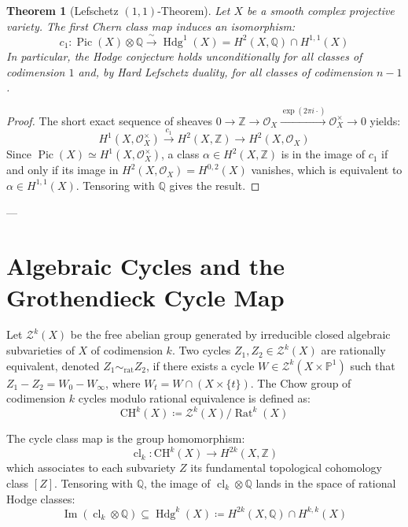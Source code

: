\documentclass[11pt,a4paper]{article}
\newtheorem{theorem}{Theorem}[section]
\theoremstyle{definition}
\begin{document}
\begin{theorem}[Lefschetz $(1,1)$-Theorem]
Let $X$ be a smooth complex projective variety. The first Chern class map induces an isomorphism:
\begin{equation}
c_1 : \operatorname{Pic}(X) \otimes \mathbb{Q} \xrightarrow{\;\sim\;} \operatorname{Hdg}^1(X) = H^2(X, \mathbb{Q}) \cap H^{1,1}(X)
\end{equation}
In particular, the Hodge conjecture holds unconditionally for all classes of codimension $1$ and, by Hard Lefschetz duality, for all classes of codimension $n-1$.
\end{theorem}
\begin{proof}
The short exact sequence of sheaves $0 \to \mathbb{Z} \to \mathcal{O}_X \xrightarrow{\exp(2\pi i \cdot)} \mathcal{O}_X^\times \to 0$ yields:
\begin{equation}
H^1(X, \mathcal{O}_X^\times) \xrightarrow{c_1} H^2(X, \mathbb{Z}) \longrightarrow H^2(X, \mathcal{O}_X)
\end{equation}
Since $\operatorname{Pic}(X) \simeq H^1(X, \mathcal{O}_X^\times)$, a class $\alpha \in H^2(X, \mathbb{Z})$ is in the image of $c_1$ if and only if its image in $H^2(X, \mathcal{O}_X) = H^{0,2}(X)$ vanishes, which is equivalent to $\alpha \in H^{1,1}(X)$. Tensoring with $\mathbb{Q}$ gives the result.
\end{proof}

---

\section{Algebraic Cycles and the Grothendieck Cycle Map}
Let $\mathcal{Z}^k(X)$ be the free abelian group generated by irreducible closed algebraic subvarieties of $X$ of codimension $k$. Two cycles $Z_1, Z_2 \in \mathcal{Z}^k(X)$ are rationally equivalent, denoted $Z_1 \sim_{\mathrm{rat}} Z_2$, if there exists a cycle $W \in \mathcal{Z}^k(X \times \mathbb{P}^1)$ such that $Z_1 - Z_2 = W_0 - W_\infty$, where $W_t = W \cap (X \times \{t\})$.
The Chow group of codimension $k$ cycles modulo rational equivalence is defined as:
\begin{equation}
\mathrm{CH}^k(X) \coloneqq \mathcal{Z}^k(X) / \operatorname{Rat}^k(X)
\end{equation}

The cycle class map is the group homomorphism:
\begin{equation}
\operatorname{cl}_k : \mathrm{CH}^k(X) \longrightarrow H^{2k}(X, \mathbb{Z})
\end{equation}
which associates to each subvariety $Z$ its fundamental topological cohomology class $[Z]$. Tensoring with $\mathbb{Q}$, the image of $\operatorname{cl}_k \otimes \mathbb{Q}$ lands in the space of rational Hodge classes:
\begin{equation}
\operatorname{Im}(\operatorname{cl}_k \otimes \mathbb{Q}) \subseteq \operatorname{Hdg}^k(X) \coloneqq H^{2k}(X, \mathbb{Q}) \cap H^{k,k}(X)
\end{equation}
\end{document}
